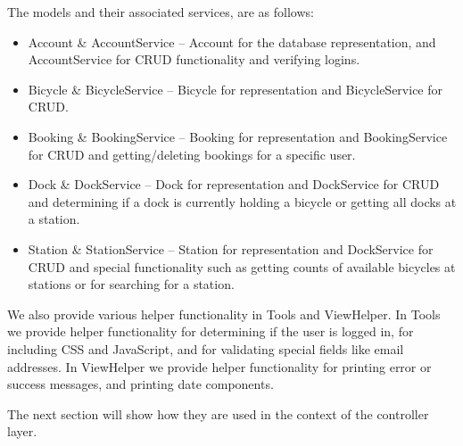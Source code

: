 The models and their associated services, are as follows:

\begin{itemize}
\item Account \& AccountService -- Account for the database representation, and AccountService for CRUD functionality and verifying logins.
\item Bicycle \& BicycleService -- Bicycle for representation and BicycleService for CRUD.
\item Booking \& BookingService -- Booking for representation and BookingService for CRUD and getting/deleting bookings for a specific user.
\item Dock \& DockService -- Dock for representation and DockService for CRUD and determining if a dock is currently holding a bicycle or getting all docks at a station.
\item Station \& StationService -- Station for representation and DockService for CRUD and special functionality such as getting counts of available bicycles at stations or for searching for a station.
\end{itemize}

We also provide various helper functionality in Tools and ViewHelper. 
In Tools we provide helper functionality for determining if the user is logged in, for including CSS and JavaScript, and for validating special fields like email addresses.
In ViewHelper we provide helper functionality for printing error or success messages, and printing date components.

 The next section will show how they are used in the context of the controller layer.